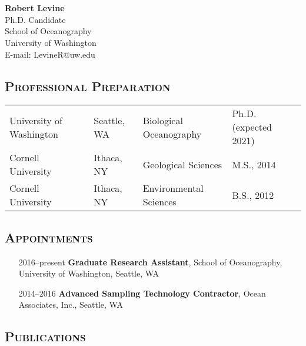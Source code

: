 \documentclass[svgnames,12pt,a4paper]{article}
\date{}
\author{}
\let\origsection\section%
\let\section\subsubsection%
\let\section\origsection%
\begin{document}
\section*{}
\textbf{\large{Robert Levine}}\\
Ph.D. Candidate\\
School of Oceanography\\
University of Washington\\
E-mail: LevineR@uw.edu\\
\vspace*{-.7cm}

\subsection*{\textsc{Professional Preparation}}
\begin{tabular}{ l l l l }
 University of Washington & Seattle, WA & Biological Oceanography & Ph.D. (expected 2021) \\
 Cornell University & Ithaca, NY & Geological Sciences & M.S., 2014 \\
 Cornell University & Ithaca, NY & Environmental Sciences & B.S., 2012 \\
\end{tabular}
\vspace*{-.5cm}

\subsection*{\textsc{Appointments}}
\vspace*{-.2cm}
\begin{itemize}[label={--9999:},leftmargin=*,itemsep=-3pt]
\item[2016--present]
    \textbf{Graduate Research Assistant},
    School of Oceanography, University of Washington, Seattle, WA
\item[2014--2016]
    \textbf{Advanced Sampling Technology Contractor},
    Ocean Associates, Inc., Seattle, WA
\end{itemize}

\vspace*{-.7cm}
\subsection*{\textsc{Publications}}
\end{document}
